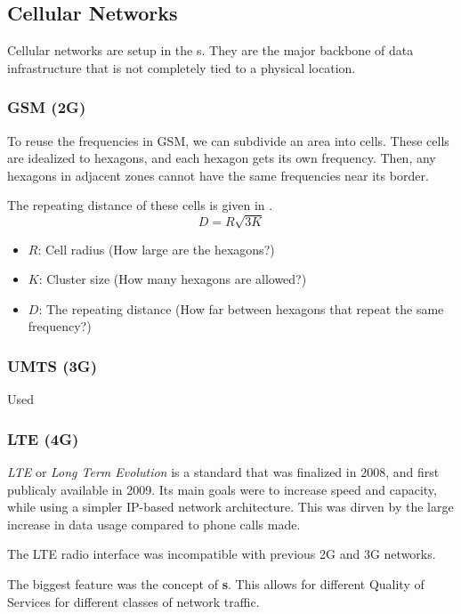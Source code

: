 \subsection{Cellular Networks}\label{subsec:Cell_Networks}
Cellular networks are setup in the s.
They are the major backbone of data infrastructure that is not completely tied to a physical location.

\subsubsection{GSM (2G)}\label{subsubsec:2G}
To reuse the frequencies in GSM, we can subdivide an area into cells.
These cells are idealized to hexagons, and each hexagon gets its own frequency.
Then, any hexagons in adjacent zones cannot have the same frequencies near its border.

The repeating distance of these cells is given in .
\begin{equation}\label{eq:GSM_Cell_Repeat_Distance}
  D = R \sqrt{3K}
\end{equation}
\begin{itemize}[noitemsep]
\item $R$: Cell radius (How large are the hexagons?)
\item $K$: Cluster size (How many hexagons are allowed?)
\item $D$: The repeating distance (How far between hexagons that repeat the same frequency?)
\end{itemize}

\subsubsection{UMTS (3G)}\label{subsubsec:3G}
Used 

\subsubsection{LTE (4G)}\label{subsubsec:4G}
\begin{definition}[LTE]\label{def:LTE}
  \emph{LTE} or \emph{Long Term Evolution} is a standard that was finalized in 2008, and first publicaly available in 2009.
  Its main goals were to increase speed and capacity, while using a simpler IP-based network architecture.
  This was dirven by the large increase in data usage compared to phone calls made.

  The LTE radio interface was incompatible with previous 2G and 3G networks.

  The biggest feature was the concept of \textbf{s}.
  This allows for different Quality of Services for different classes of network traffic.
\end{definition}

